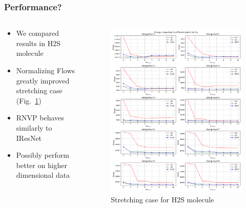 \begin{frame}
    \frametitle{Performance?}
    \begin{columns}
        \begin{column}[t]{0.48\textwidth}
            \begin{itemize}
                \setlength\itemsep{.8em}
                \item We compared results in H2S molecule
                \item Normalizing Flows greatly improved stretching case (Fig.~\ref{fig:enrs_stretch_2D})
                \item RNVP behaves similarly to IResNet
                \item Possibly perform better on higher dimensional data
            \end{itemize}
        \end{column}
        \begin{column}[t]{0.48\textwidth}
            \begin{figure}
                \includegraphics[width=\textwidth]{img/enrs_stretch_2D.png}
                \caption{Stretching case for H2S molecule}
                \label{fig:enrs_stretch_2D}
            \end{figure}
        \end{column}
    \end{columns}
\end{frame}